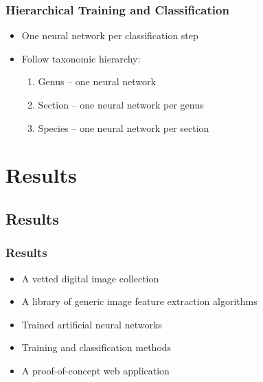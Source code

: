 \documentclass[]{beamer}
\begin{document}
    \begin{frame}
        \frametitle{Hierarchical Training and Classification}

        \begin{itemize}
            \item One neural network per classification step
            \item Follow taxonomic hierarchy:
            \begin{enumerate}
                \item Genus -- one neural network
                \item Section -- one neural network per genus
                \item Species -- one neural network per section

                \vspace{10 mm}

            \end{enumerate}
        \end{itemize}
    \end{frame}


\section{Results}

    \subsection{Results}

    \begin{frame}
        \frametitle{Results}

        \begin{itemize}
            \item A vetted digital image collection
            \item A library of generic image feature extraction algorithms
            \item Trained artificial neural networks
            \item Training and classification methods
            \item A proof-of-concept web application
        \end{itemize}
    \end{frame}
\end{document}
